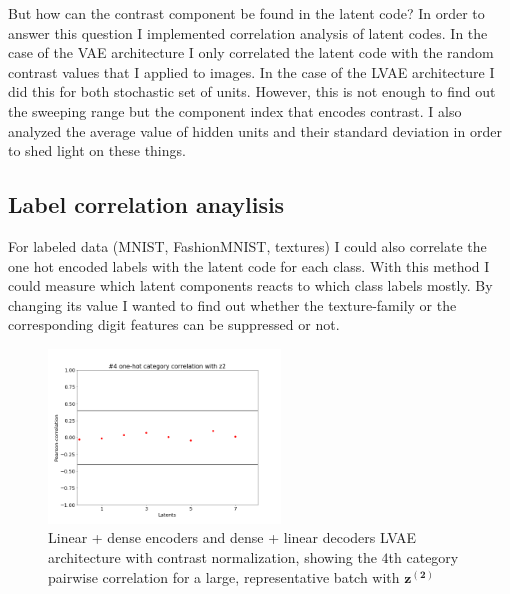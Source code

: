 \documentclass[12pt, english]{article}
\begin{document}
\vspace{4mm}

\par But how can the contrast component be found in the latent code? In order to answer this question I implemented correlation analysis of latent codes. In the case of the VAE architecture I only correlated the latent code with the random contrast values that I applied to images. In the case of the LVAE architecture I did this for both stochastic set of units. However, this is not enough to find out the sweeping range but the component index that encodes contrast. I also analyzed the average value of hidden units and their standard deviation in order to shed light on these things.

\vspace{4mm}

\subsection{Label correlation anaylisis}

\vspace{4mm}

\par For labeled data (MNIST, FashionMNIST, textures) I could also correlate the one hot encoded labels with the latent code for each class. With this method I could measure which latent components reacts to which class labels mostly. By changing its value I wanted to find out whether the texture-family or the corresponding digit features can be suppressed or not.

\vspace{4mm}

\begin{figure}[H]
    \centering
    \includegraphics[width=0.55\textwidth]{17_DenseLinLinLadderVAE_contrastNorm-cat-4-to-z2-corr.png}
    \caption{Linear + dense encoders and dense + linear decoders LVAE architecture with contrast normalization, showing the $4$th category pairwise correlation for a large, representative batch with $\bm{z^{(2)}}$}
\end{figure}
\end{document}
